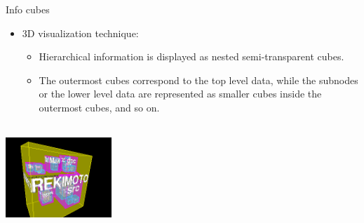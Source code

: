 \documentclass[aspectratio=169,t]{beamer}
\begin{document}
  { 
    \begin{frame}{Info cubes}
    \begin{itemize}
      \item $3$D visualization technique:
      \begin{itemize}
        \item Hierarchical information is displayed as nested semi-transparent cubes.
        \item The outermost cubes correspond to the top level data, while the subnodes or the lower level data are represented as smaller cubes inside the outermost cubes, and so on.
      \end{itemize}
    \end{itemize}
    \vspace{0.2cm}
    \centering
    \includegraphics[width=4cm,height=4cm]{img/infocube.png}
    \end{frame}
  }
\end{document}
